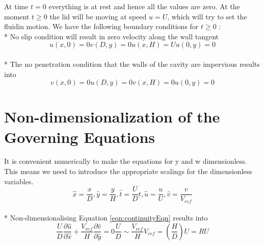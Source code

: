 \documentclass{article}
\begin{document}
At time $t=0$ everything is at rest and hence all the values are zero. At the moment $t \geq0$ the lid will be moving at speed $u=U$, which will try to set the fluidin motion. We have the following boundary conditions for $t\geq0$ :
\\*
No slip condition will result in zero velocity along the wall tangent
\begin{subequations}
\begin{equation}
u(x,0)=0
\end{equation}
\begin{equation}
v(D,y)=0
\end{equation}
\begin{equation}
u(x,H)=U
\end{equation}
\begin{equation}
u(0,y)=0
\end{equation}
\end{subequations}
\\*
The no penetration condition that the walls of the cavity are impervious results into
\begin{subequations}
\begin{equation}
v(x,0)=0
\end{equation}
\begin{equation}
u(D,y)=0
\end{equation}
\begin{equation}
v(x,H)=0
\end{equation}
\begin{equation}
u(0,y)=0
\end{equation}
\end{subequations}


\section{Non-dimensionalization of the Governing Equations}
It is convenient numerically to make the equations for y and w dimensionless. This means we need to introduce the appropriate scalings for the dimensionless variables.
\begin{equation}
\hat{x}=\frac{x}{D}, \hat{y}=\frac{y}{H},  \hat{t}=\frac{U}{D}t,  \hat{u}=\frac{u}{U},  \hat{v}=\frac{v}{V_{ref}}
\end{equation}
\\*
Non-dimensionalising Equation \ref{eqn:continuityEqn} results into 
\begin{subequations}
\begin{equation}
\frac{U}{D}\frac{\partial \hat{u}}{\partial \hat{x}} + \frac{V_{ref}}{H}\frac{\partial \hat{v}}{\partial \hat{y}} = 0  
\end{equation}
\begin{equation}
\frac{U}{D}\sim \frac{V_{ref}}{H}  
\end{equation}
\begin{equation}
V_{ref}= \left(\frac{H}{D}\right)U = RU  
\end{equation}
\end{subequations}
\end{document}
